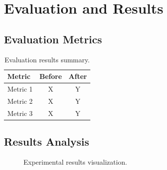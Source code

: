 \section{Evaluation and Results}

\lipsum[1]

\subsection{Evaluation Metrics}

\lipsum[2]

\begin{table}[H]
	\centering
	\caption{Evaluation results summary.}
	\label{tab:results}
	\begin{tabular}{|p{4cm}|c|c|}
		\hline
		\textbf{Metric} & \textbf{Before} & \textbf{After} \\
		\hline
		Metric 1 & X & Y \\
		\hline
		Metric 2 & X & Y \\
		\hline
		Metric 3 & X & Y \\
		\hline
	\end{tabular}
\end{table}

\subsection{Results Analysis}

\lipsum[3]

\begin{figure}[H]
	\centering
	\caption{Experimental results visualization.}
	\label{fig:results}
\end{figure}

